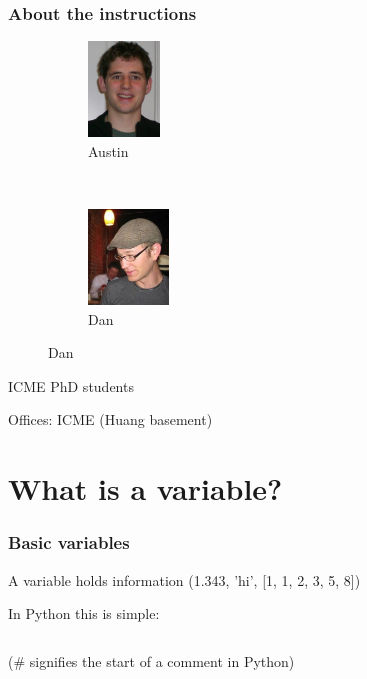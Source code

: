 \documentclass{beamer}
\begin{document}
\begin{frame}
\frametitle{About the instructions}

\begin{figure}
        \centering
	\begin{subfigure}[b]{0.45\textwidth}
	\centering
	\includegraphics[height=1in]{"images/austin"}
	\caption{Austin}
	\label{fig:hw2_15a}
	\end{subfigure}
        ~ %
	\begin{subfigure}[b]{0.45\textwidth}
	\centering
	\includegraphics[height=1in]{"images/dan"}
	\caption{Dan}
	\label{fig:hw2_15b}
	\end{subfigure}
\end{figure}

ICME PhD students

Offices: ICME (Huang basement)

\end{frame}

\section{What is a variable?}
\begin{frame}
\frametitle{Basic variables}

A variable holds information (1.343, 'hi', [1, 1, 2, 3, 5, 8])

\vspace{0.2in}

In Python this is simple:

\begin{center}
\begin{tabular}{c}

\end{tabular}
\end{center}

(\textcolor{thegreen}{\#} signifies the start of a comment in Python)

\end{frame}
\end{document}
